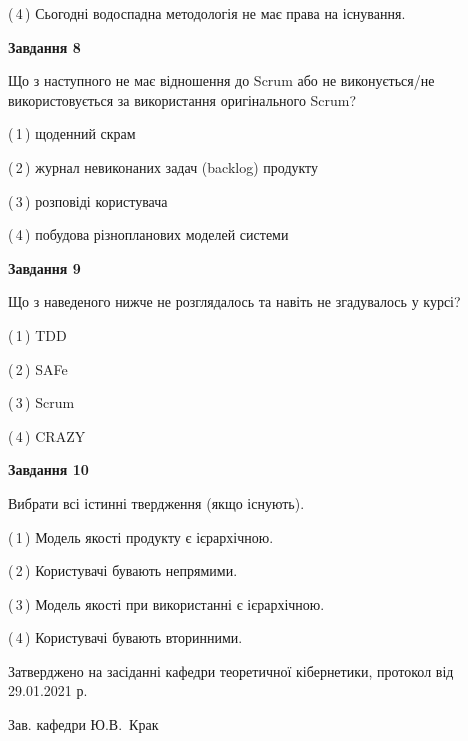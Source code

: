 \documentclass[10pt, ukrainian]{article}
\begin{document}
{\begin {large}
(\,4\,) Сьогодні водоспадна методологія не має права на існування. %


{\begin {center}\textbf{Завдання 8}\end {center}}\par
Що з наступного не має відношення до Scrum або не виконується/не використовується за використання оригінального Scrum?\par
\vspace{2mm}



(\,1\,) щоденний скрам%



(\,2\,) журнал невиконаних задач (backlog) продукту%



(\,3\,) розповіді користувача%



(\,4\,) побудова різнопланових моделей системи%


{\begin {center}\textbf{Завдання 9}\end {center}}\par
Що з наведеного нижче не розглядалось та навіть не згадувалось у курсі?\par
\vspace{2mm}



(\,1\,) TDD%



(\,2\,) SAFe%



(\,3\,) Scrum%



(\,4\,) CRAZY%


{\begin {center}\textbf{Завдання 10}\end {center}}\par
Вибрати всі істинні твердження (якщо існують).\par
\vspace{2mm}



(\,1\,) Модель якості продукту є ієрархічною.%



(\,2\,) Користувачі бувають непрямими.%



(\,3\,) Модель якості при використанні є ієрархічною.%



(\,4\,) Користувачі бувають вторинними.%



\end {large}}
{\vspace{5mm}\smallskip \begin {small} Затверджено на засіданні кафедри теоретичної кібернетики, протокол  від   29.01.2021 р.\par\smallskip\smallskip
{\parbox {6.5 cm}{Зав. кафедри \dotfill Ю.В.~Крак}} \end{small}}
\newpage
\end{document}
